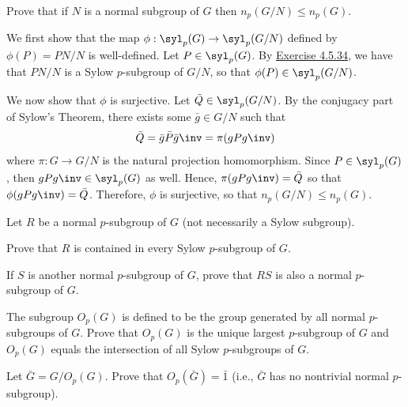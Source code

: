 \begin{exercise}\label{ex4.5.36}
	Prove that if $N$ is a normal subgroup of $G$ then $n_p(G/N) \leq n_p(G)$.
\end{exercise}

\begin{sol}
	We first show that the map $\phi : \syl_p(G) \to \syl_p(G/N)$ defined by $\phi(P) = PN/N$ is well-defined. Let $P \in \syl_p(G)$. By \hyperref[ex4.5.34]{Exercise 4.5.34}, we have that $PN/N$ is a Sylow $p$-subgroup of $G/N$, so that $\phi(P) \in \syl_p(G/N)$.

	We now show that $\phi$ is surjective. Let $\bar Q \in \syl_p(G/N)$. By the conjugacy part of Sylow's Theorem, there exists some $\bar g \in G/N$ such that
	\[\bar Q = \bar g\bar P\bar g\inv = \pi(gPg\inv)\]
	where $\pi : G \to G/N$ is the natural projection homomorphism. Since $P \in \syl_p(G)$, then $gPg\inv \in \syl_p(G)$ as well. Hence, $\pi(gPg\inv) = \bar Q$ so that $\phi(gPg\inv) = \bar Q$. Therefore, $\phi$ is surjective, so that $n_p(G/N) \leq n_p(G)$.
\end{sol}

\newpage

\begin{exercise}\label{ex4.5.37}
	Let $R$ be a normal $p$-subgroup of $G$ (not necessarily a Sylow subgroup).
	\begin{subproblems}
		\item Prove that $R$ is contained in every Sylow $p$-subgroup of $G$.
		\item If $S$ is another normal $p$-subgroup of $G$, prove that $RS$ is also a normal $p$-subgroup of $G$.
		\item The subgroup $O_p(G)$ is defined to be the group generated by all normal $p$-subgroups of $G$. Prove that $O_p(G)$ is the unique largest $p$-subgroup of $G$ and $O_p(G)$ equals the intersection of all Sylow $p$-subgroups of $G$.
		\item Let $\bar G = G/O_p(G)$. Prove that $O_p(\bar G) = \bar 1$ (i.e., $\bar G$ has no nontrivial normal $p$-subgroup).
	\end{subproblems}
\end{exercise}

